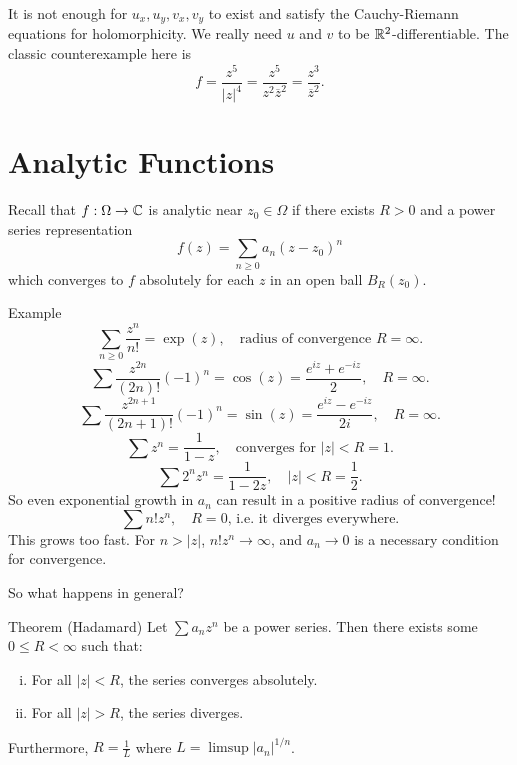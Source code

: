 \begin{remark}
  It is not enough for $u_x, u_y, v_x, v_y$ to exist
  and satisfy the Cauchy-Riemann equations for
  holomorphicity. We really need $u$ and $v$ to be
  $\mathbb{R}^2$-differentiable. The classic counterexample here
  is
  \[
  f = \frac{z^5}{|z|^4}
  = \frac{z^5}{z^2 {\overline{z}}^2}
  = \frac{z^3}{{\overline{z}}^2}
  .\]
\end{remark}

\section{Analytic Functions}
Recall that $f : \Omega \to \mathbb{C}$ is analytic near
$z_0 \in \Omega$ if there exists $R > 0$ and a power series
representation
\[
  f(z) = \sum_{n \ge 0} a_n(z - z_0)^n
\]
which converges to $f$ absolutely for each $z$
in an open ball $B_R(z_0)$.

\begin{examp}{Example}
  \[\sum_{n \ge 0} \frac{z^n}{n!} = \exp(z), \quad \text{radius of convergence $R = \infty$.}\]
  \[
    \sum \frac{z^{2n}}{(2n)!} (-1)^n
    = \cos(z) = \frac{e^{iz} + e^{-iz}}{2}, \quad R = \infty.
  \]
  \[
    \sum \frac{z^{2n + 1}}{(2n + 1)!} (-1)^n
    = \sin(z) = \frac{e^{iz} - e^{-iz}}{2i}, \quad R = \infty.
  \]
  \[
    \sum z^n = \frac{1}{1 - z}, \quad \text{converges for $|z| < R = 1$}.
  \]
  \[
    \sum 2^n z^n
    = \frac{1}{1 - 2z}, \quad |z| < R = \frac{1}{2}
  .\]
  So even exponential growth in $a_n$ can result in a
  positive radius of convergence!
  \[
    \sum n! z^n, \quad \text{$R = 0$, i.e. it diverges everywhere}
  .\]
  This grows too fast. For $n > |z|$, $n! z^n \to \infty$,
  and $a_n \to 0$ is a necessary condition for convergence.
\end{examp}

So what happens in general?

\begin{thm}{Theorem (Hadamard)}
  Let $\sum a_n z^n$ be a power series. Then there exists
  some $0 \le R < \infty$ such that:
  \begin{enumerate}[(i)]
    \item For all $|z| < R$, the series converges absolutely.
    \item For all $|z| > R$, the series diverges.
  \end{enumerate}
  Furthermore, $R = \frac{1}{L}$ where
  $L = \limsup |a_n|^{1 / n}$.
\end{thm}

